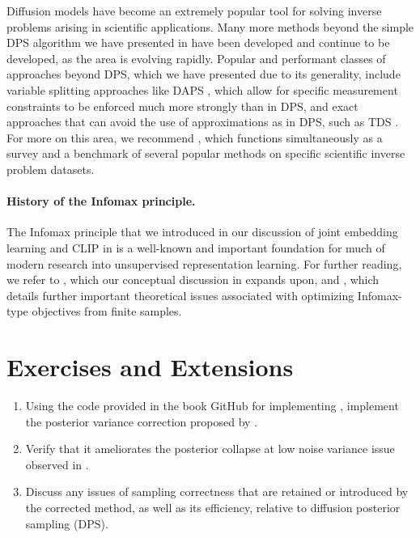 \documentclass[../../book-main.tex]{subfiles}
\begin{document}
Diffusion models have become an extremely popular tool for solving inverse
problems arising in scientific applications. Many more methods beyond the simple
DPS algorithm we have presented in
 have been
developed and continue to be developed, as the area is evolving rapidly.
Popular and performant classes of approaches beyond DPS, which we have presented
due to its generality, include variable splitting approaches like DAPS
\cite{Zhang2024-ha},
which allow for specific measurement constraints to be enforced much more
strongly than in DPS, and exact approaches that can avoid the use of
approximations as in DPS, such as TDS \cite{wu2023practical}.
For more on this area, we recommend \cite{zheng2025inversebench}, which
functions simultaneously as a survey and a benchmark of several popular methods
on specific scientific inverse problem datasets.

\paragraph{History of the Infomax principle.}
The Infomax principle \cite{infomax} that we introduced in our discussion of
joint embedding learning and CLIP in  is a well-known and
important foundation for much of modern research into unsupervised
representation learning. For further reading, we refer to
\cite{Van_den_Oord2018-qf}, which our conceptual discussion in
 expands upon,
and \cite{Oko2025-wk}, which details further important theoretical
issues associated with
optimizing Infomax-type objectives from finite samples.

\section{Exercises and Extensions}

\begin{exercise}

    \begin{enumerate}
        \item Using the code provided in the book GitHub for implementing
            ,
            implement the
            posterior variance correction proposed by
            \textcite{rozet2024learning}.
        \item Verify that it ameliorates the posterior collapse at low noise
            variance issue observed in
            .
        \item Discuss any issues of sampling correctness that are retained or
            introduced by the corrected method, as well as its
            efficiency, relative to
            diffusion posterior sampling (DPS).
    \end{enumerate}

\end{exercise}
\end{document}
